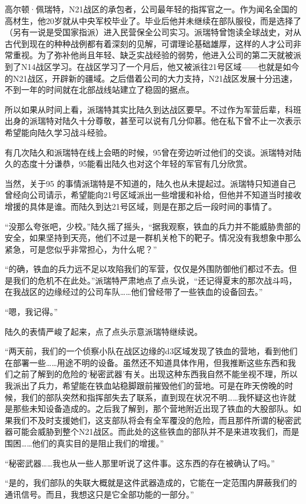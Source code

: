 高尔顿·佩瑞特，N21战区的承包者，公司最年轻的指挥官之一。作为闻名全国的高材生，他20岁就从中央军校毕业了。毕业后他并未继续在部队服役，而是选择了（另有一说是受国家指派）进入民营保全公司实习。派瑞特曾饱读全球战史，对从古代到现在的种种战例都有着深刻的见解，可谓理论基础雄厚，这样的人才公司非常重视。为了弥补他尚且年轻、缺乏实战经验的弱势，他进入公司的第二天就被派到了N14战区学习。在战区学习了一个月后，他又被派往21号区域——也就是如今的N21战区，开辟新的疆域。之后借着公司的大力支持，N21战区发展十分迅速，不到一年的时间就在北部战线站建立了稳固的据点。

所以如果从时间上看，派瑞特其实比陆久到达战区要早。不过作为军营后辈，科班出身的派瑞特对陆久十分尊敬，甚至可以说有几分仰慕。他在私下曾不止一次表示希望能向陆久学习战斗经验。

有几次陆久和派瑞特在线上会晤的时候，95曾在旁边听过他们的交谈。派瑞特对陆久的态度十分谦恭，95能看出陆久也对这个年轻的军官有几分欣赏。

当然，关于95 的事情派瑞特是不知道的，陆久也从未提起过。派瑞特只知道自己曾经向公司请示，希望能向21号区域派出一些增援和补给，但他并不知道当时接收增援的具体是谁。而陆久到达21号区域，则是在那之后一段时间的事情了。

“没那么夸张吧，少校。”陆久摇了摇头，“据我观察，铁血的兵力并不能威胁贵部的安全，如果坚持到天亮，他们不过是一群机关枪下的靶子。情况没有我想象中那么紧急，可是您似乎非常担心，为什么呢？”

“的确，铁血的兵力远不足以攻陷我们的军营，仅仅是外围防御他们都过不去。但是我们的危机不在此处。”派瑞特严肃地点了点头说，“还记得夏末的那次战斗吗，在我战区的边缘经过的公司车队……他们曾经带了一些铁血的设备回去。”

“嗯，我记得。”

陆久的表情严峻了起来，点了点头示意派瑞特继续说。

“两天前，我们的一个侦察小队在战区边缘的d3区域发现了铁血的营地，看到他们在部署一些……用途不明的设备。虽然还不知道具体作用，但我推断这些东西和我们之前了解到的危险的‘秘密武器’有关。出现这种东西我自然不能坐视不理，所以我派出了兵力，希望能在铁血站稳脚跟前摧毁他们的营地。可是在昨天傍晚的时候，我们的部队突然和指挥部失去了联系，直到现在状况不明……我怀疑这也许就是那些未知设备造成的。之后我了解到，那个营地附近出现了铁血的大股部队。如果我们不及时支援她们，这支部队将会有全军覆没的危险，而且那件所谓的秘密武器可能会威胁到整个N21战区。而此处的这些铁血的部队并不是来进攻我们，而是围困……他们的真实目的是阻止我们的增援。”

“秘密武器……我也从一些人那里听说了这件事。这东西的存在被确认了吗。”

“是的，我们部队的失联大概就是这件武器造成的，它能在一定范围内屏蔽我们的通讯信号。而且，我想这只是它全部功能的一部分。”

